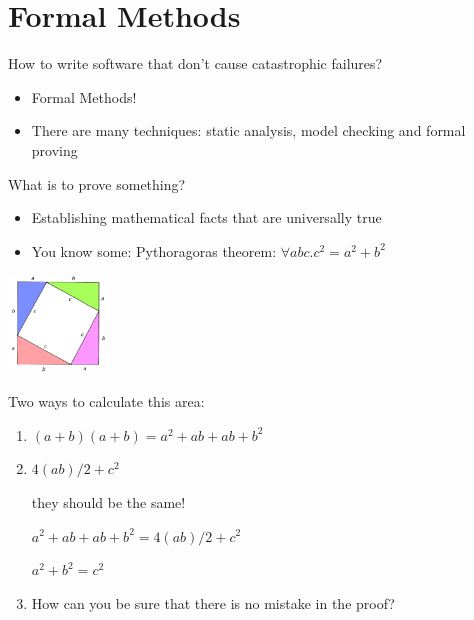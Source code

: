 \documentclass[presentation]{beamer}
\begin{document}
\section{Formal Methods}
\label{sec:org3cba742}
\begin{frame}[label={sec:orgd1a428f}]{How to write software that don't cause catastrophic failures?}
\begin{itemize}
\item Formal Methods!
\item There are many techniques: static analysis, model checking and formal proving
\end{itemize}
\end{frame}
\begin{frame}[label={sec:orge7953b0}]{What is to prove something?}
\begin{itemize}
\item Establishing mathematical facts that are universally true
\item You know some: Pythoragoras theorem: \(\forall a b c. c^2 = a^2 + b^2\)
\end{itemize}
\begin{center}
\includegraphics[width=0.2\textwidth]{./pythagoras.png}
\end{center}

Two ways to calculate this area:
\begin{enumerate}
\item \((a + b)(a + b) = a^2 + ab + ab + b^2\)
\item \(4(ab)/2 + c^2\)

they should be the same!

\(a^2 + ab + ab + b^2 = 4(ab)/2 + c^2\)

\(a^2 + b^2 = c^2\)

\item How can you be sure that there is no mistake in the proof?
\end{enumerate}
\end{frame}
\end{document}
